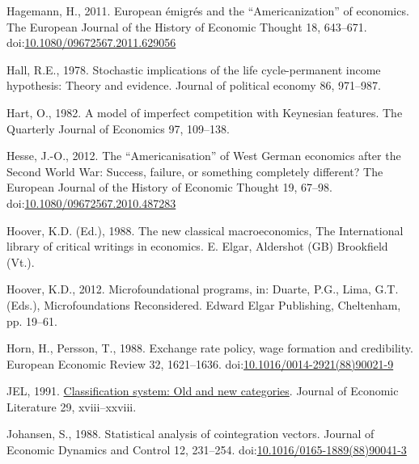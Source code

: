 \documentclass[
  12pt,
  onecolumn]{article}
\newlength{\cslhangindent}
\newlength{\cslentryspacingunit} %
\newenvironment{CSLReferences}[2] %
 {%
  \setlength{\parindent}{0pt}
  \ifodd #1
  \let\oldpar\par
  \def\par{\hangindent=\cslhangindent\oldpar}
  \fi
  \setlength{\parskip}{#2\cslentryspacingunit}
 }%
 {}
\begin{document}
\begin{CSLReferences}{1}{0}
\leavevmode{}%
Hagemann, H., 2011. European émigrés and the {``{Americanization}''} of
economics. The European Journal of the History of Economic Thought 18,
643--671.
doi:\href{https://doi.org/10.1080/09672567.2011.629056}{10.1080/09672567.2011.629056}

\leavevmode{}%
Hall, R.E., 1978. Stochastic implications of the life cycle-permanent
income hypothesis: Theory and evidence. Journal of political economy 86,
971--987.

\leavevmode{}%
Hart, O., 1982. A model of imperfect competition with {Keynesian}
features. The Quarterly Journal of Economics 97, 109--138.

\leavevmode{}%
Hesse, J.-O., 2012. The {``{Americanisation}''} of {West German}
economics after the {Second World War}: {Success}, failure, or something
completely different? The European Journal of the History of Economic
Thought 19, 67--98.
doi:\href{https://doi.org/10.1080/09672567.2010.487283}{10.1080/09672567.2010.487283}

\leavevmode{}%
Hoover, K.D. (Ed.), 1988. The new classical macroeconomics, The
{International} library of critical writings in economics. E. Elgar,
Aldershot (GB) Brookfield (Vt.).

\leavevmode{}%
Hoover, K.D., 2012. Microfoundational programs, in: Duarte, P.G., Lima,
G.T. (Eds.), Microfoundations {Reconsidered}. Edward Elgar Publishing,
Cheltenham, pp. 19--61.

\leavevmode{}%
Horn, H., Persson, T., 1988. Exchange rate policy, wage formation and
credibility. European Economic Review 32, 1621--1636.
doi:\href{https://doi.org/10.1016/0014-2921(88)90021-9}{10.1016/0014-2921(88)90021-9}

\leavevmode{}%
JEL, 1991. \href{https://www.jstor.org/stable/2727351}{Classification
system: Old and new categories}. Journal of Economic Literature 29,
xviii--xxviii.

\leavevmode{}%
Johansen, S., 1988. Statistical analysis of cointegration vectors.
Journal of Economic Dynamics and Control 12, 231--254.
doi:\href{https://doi.org/10.1016/0165-1889(88)90041-3}{10.1016/0165-1889(88)90041-3}


\end{CSLReferences}
\end{document}
